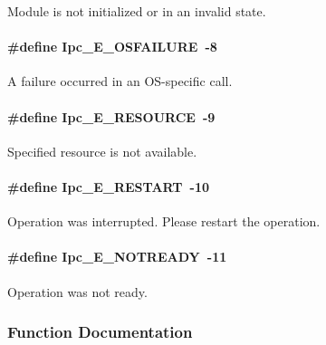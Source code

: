 Module is not initialized or in an invalid state. 

\paragraph[{Ipc\_\-E\_\-OSFAILURE}]{\setlength{\rightskip}{0pt plus 5cm}\#define Ipc\_\-E\_\-OSFAILURE~-\/8}\hfill\label{_ipc_8h_ae747ac1c4d39501d31ed73c09db1fd30}


A failure occurred in an OS-\/specific call. 

\paragraph[{Ipc\_\-E\_\-RESOURCE}]{\setlength{\rightskip}{0pt plus 5cm}\#define Ipc\_\-E\_\-RESOURCE~-\/9}\hfill\label{_ipc_8h_a80f32a1da0accc7f1636b7e875cb731a}


Specified resource is not available. 

\paragraph[{Ipc\_\-E\_\-RESTART}]{\setlength{\rightskip}{0pt plus 5cm}\#define Ipc\_\-E\_\-RESTART~-\/10}\hfill\label{_ipc_8h_acaf8edc10dc7b47670564739d63f6657}


Operation was interrupted. Please restart the operation. 

\paragraph[{Ipc\_\-E\_\-NOTREADY}]{\setlength{\rightskip}{0pt plus 5cm}\#define Ipc\_\-E\_\-NOTREADY~-\/11}\hfill\label{_ipc_8h_af61be5fb093e7cd7cb076afc8b2fe798}


Operation was not ready. 



\subsubsection{Function Documentation}
